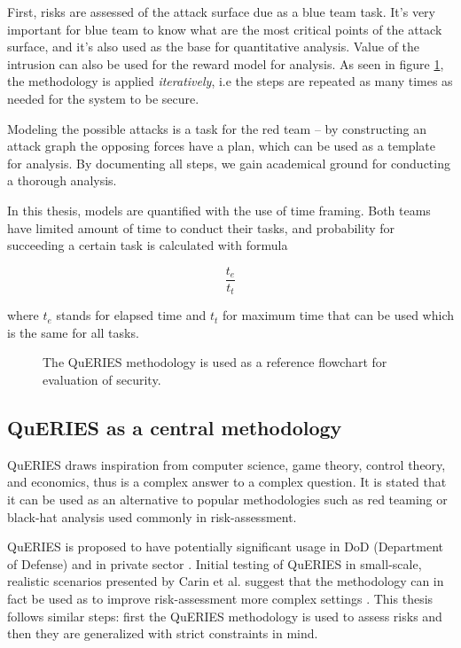 First, risks are assessed of the attack surface due as a blue team
task. It's very important for blue team to know what are the most
critical points of the attack surface, and it's also used as the base
for quantitative analysis. Value of the intrusion can also be used for
the reward model for analysis. As seen in figure \ref{parchitecture},
the methodology is applied \textit{iteratively}, i.e the steps are
repeated as many times as needed for the system to be secure.

Modeling the possible attacks is a task for the red team – by
constructing an attack graph the opposing forces have a plan, which
can be used as a template for analysis. By documenting all steps, we
gain academical ground for conducting a thorough analysis.

In this thesis, models are quantified with the use of time
framing. Both teams have limited amount of time to conduct their
tasks, and probability for succeeding a certain task is calculated
with formula

\[ \frac{t_e}{t_t} \]

where \(t_e\) stands for elapsed time and \(t_t\) for maximum time
that can be used which is the same for all tasks.

\begin{figure}[t!]
\centerline{}
\caption{The QuERIES methodology is used as a reference flowchart for
  evaluation of security. \cite{hughes2013quantitative}}
\label{parchitecture}
\end{figure}
\subsection{QuERIES as a central methodology}

QuERIES draws inspiration from computer science, game theory, control
theory, and economics, thus is a complex answer to a complex
question. It is stated that it can be used as an alternative to
popular methodologies such as red teaming or black-hat analysis used
commonly in risk-assessment. \cite{carin2008cybersecurity}

QuERIES is proposed to have potentially significant usage in DoD
(Department of Defense) and in private sector
\cite{carin2008cybersecurity}. Initial testing of QuERIES in
small-scale, realistic scenarios presented by Carin et al. suggest
that the methodology can in fact be used as to improve risk-assessment
more complex settings \cite{carin2008cybersecurity}. This thesis
follows similar steps: first the QuERIES methodology is used to assess
risks and then they are generalized with strict constraints in mind.

